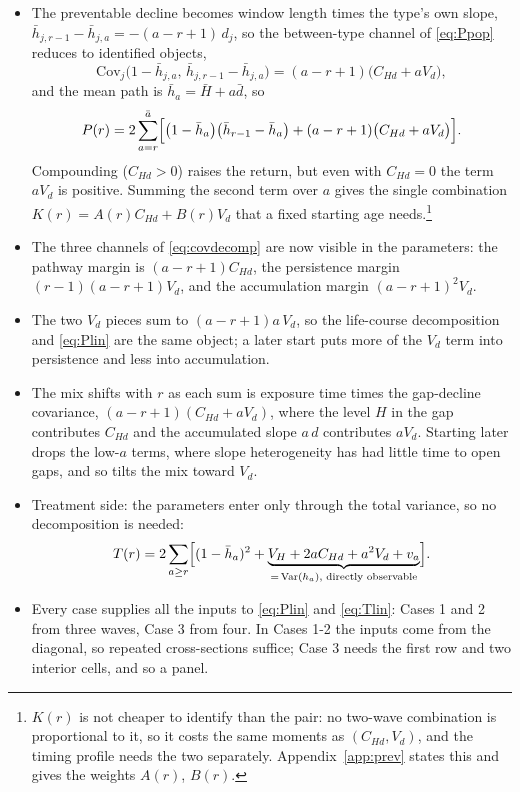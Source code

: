 \documentclass[11pt]{article}
\theoremstyle{remark}
\newcommand{\Var}{\mathrm{Var}}
\newcommand{\Cov}{\mathrm{Cov}}
\begin{document}
\begin{itemize}
\item The preventable decline becomes window length times the type's own slope, $\bar h_{j,r-1}-\bar h_{j,a}=-(a-r+1)\,d_j$, so the between-type channel of \eqref{eq:Ppop} reduces to identified objects,
\begin{equation}
\Cov_j\bigl(1-\bar h_{j,a},\,\bar h_{j,r-1}-\bar h_{j,a}\bigr)=(a-r+1)\bigl(C_{Hd}+aV_d\bigr),
\end{equation}
and the mean path is $\bar h_a=\bar H+a\bar d$, so
\begin{equation}
P(r)=2\sum_{a=r}^{\bar a}\Bigl[\bigl(1-\bar h_a\bigr)\bigl(\bar h_{r-1}-\bar h_a\bigr)+(a-r+1)\bigl(C_{Hd}+aV_d\bigr)\Bigr].
\label{eq:Plin}
\end{equation}
Compounding ($C_{Hd}>0$) raises the return, but even with $C_{Hd}=0$ the term $aV_d$ is positive.
Summing the second term over $a$ gives the single combination $K(r)=A(r)C_{Hd}+B(r)V_d$ that a fixed starting age needs.\footnote{$K(r)$ is not cheaper to identify than the pair: no two-wave combination is proportional to it, so it costs the same moments as $(C_{Hd},V_d)$, and the timing profile needs the two separately.
Appendix~\ref{app:prev} states this and gives the weights $A(r)$, $B(r)$.}
\item The three channels of \eqref{eq:covdecomp} are now visible in the parameters: the pathway margin is $(a-r+1)C_{Hd}$, the persistence margin $(r-1)(a-r+1)V_d$, and the accumulation margin $(a-r+1)^2V_d$.
\item The two $V_d$ pieces sum to $(a-r+1)a\,V_d$, so the life-course decomposition and \eqref{eq:Plin} are the same object; a later start puts more of the $V_d$ term into persistence and less into accumulation.
\item The mix shifts with $r$ as each sum is exposure time times the gap-decline covariance, $(a-r+1)(C_{Hd}+aV_d)$, where the level $H$ in the gap contributes $C_{Hd}$ and the accumulated slope $a\,d$ contributes $aV_d$. Starting later drops the low-$a$ terms, where slope heterogeneity has had little time to open gaps, and so tilts the mix toward $V_d$.
\item Treatment side: the parameters enter only through the total variance, so no decomposition is needed:
\begin{equation}
	T(r)=2\sum_{a\ge r}\Bigl[(1-\bar h_a)^2+\underbrace{V_H+2aC_{Hd}+a^2V_d+v_a}_{=\,\Var(h_a)\text{, directly observable}}\Bigr].
\label{eq:Tlin}
\end{equation}
\item Every case supplies all the inputs to \eqref{eq:Plin} and \eqref{eq:Tlin}: Cases 1 and 2 from three waves, Case 3 from four.
In Cases 1-2 the inputs come from the diagonal, so repeated cross-sections suffice; Case 3 needs the first row and two interior cells, and so a panel.
\end{itemize}
\end{document}
